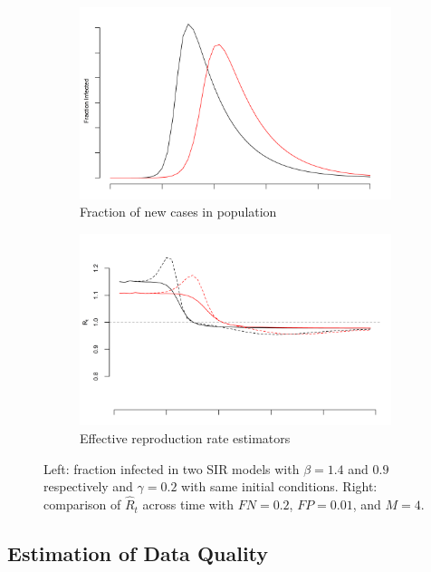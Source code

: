 \documentclass[aoas]{amsart}
\begin{document}
\begin{figure}
\centering
\begin{subfigure}{.5\textwidth}
  \centering
  \includegraphics[width=.9\linewidth]{../methods/figs/sir.png}
  \caption{Fraction of new cases in population}
  \label{fig:fracpop}
\end{subfigure}%
\begin{subfigure}{.5\textwidth}
  \centering
  \includegraphics[width=.9\linewidth]{../methods/figs/sir_rt_comparison.png}
  \caption{Effective reproduction rate estimators}
  \label{fig:eff}
\end{subfigure}
\caption{Left: fraction infected in two SIR models with $\beta = 1.4$ and $0.9$ respectively and $\gamma = 0.2$ with same initial conditions. Right: comparison of $\hat R_t$ across time with $FN = 0.2$, $FP = 0.01$, and $M = 4$.}
\label{fig:comparison}
\end{figure}

\subsection{Estimation of Data Quality}
\label{section:est_dq}
\end{document}
